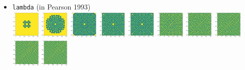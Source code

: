 \begin{itemize}
\item {\tt lambda} (in Pearson 1993)\\
\includegraphics[width=1.4cm]{python_codes/fieldstone_171/pearson93/lambda_solution_0001000_u}
\includegraphics[width=1.4cm]{python_codes/fieldstone_171/pearson93/lambda_solution_0005000_u}
\includegraphics[width=1.4cm]{python_codes/fieldstone_171/pearson93/lambda_solution_0010000_u}
\includegraphics[width=1.4cm]{python_codes/fieldstone_171/pearson93/lambda_solution_0015000_u}
\includegraphics[width=1.4cm]{python_codes/fieldstone_171/pearson93/lambda_solution_0020000_u}
\includegraphics[width=1.4cm]{python_codes/fieldstone_171/pearson93/lambda_solution_0030000_u}
\includegraphics[width=1.4cm]{python_codes/fieldstone_171/pearson93/lambda_solution_0040000_u}
\includegraphics[width=1.4cm]{python_codes/fieldstone_171/pearson93/lambda_solution_0050000_u}
\includegraphics[width=1.4cm]{python_codes/fieldstone_171/pearson93/lambda_solution_0075000_u}
\includegraphics[width=1.4cm]{python_codes/fieldstone_171/pearson93/lambda_solution_final_u}


\end{itemize}
